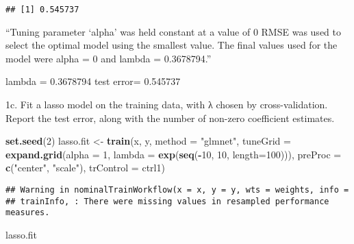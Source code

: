 \documentclass[]{article}
\newenvironment{Shaded}{\begin{snugshade}}{\end{snugshade}}
\newcommand{\CommentTok}[1]{\textcolor[rgb]{0.56,0.35,0.01}{\textit{#1}}}
\newcommand{\DataTypeTok}[1]{\textcolor[rgb]{0.13,0.29,0.53}{#1}}
\newcommand{\DecValTok}[1]{\textcolor[rgb]{0.00,0.00,0.81}{#1}}
\newcommand{\KeywordTok}[1]{\textcolor[rgb]{0.13,0.29,0.53}{\textbf{#1}}}
\newcommand{\NormalTok}[1]{#1}
\newcommand{\OperatorTok}[1]{\textcolor[rgb]{0.81,0.36,0.00}{\textbf{#1}}}
\newcommand{\StringTok}[1]{\textcolor[rgb]{0.31,0.60,0.02}{#1}}
\begin{document}
\begin{Shaded}
\end{Shaded}

\begin{verbatim}
## [1] 0.545737
\end{verbatim}

``Tuning parameter `alpha' was held constant at a value of 0 RMSE was
used to select the optimal model using the smallest value. The final
values used for the model were alpha = 0 and lambda = 0.3678794.''

lambda = 0.3678794 test error= 0.545737

1c. Fit a lasso model on the training data, with λ chosen by
cross-validation. Report the test error, along with the number of
non-zero coefficient estimates.

\begin{Shaded}
\begin{Highlighting}[]
\KeywordTok{set.seed}\NormalTok{(}\DecValTok{2}\NormalTok{)}
\NormalTok{lasso.fit <-}\StringTok{ }\KeywordTok{train}\NormalTok{(x, y,}
                   \DataTypeTok{method =} \StringTok{"glmnet"}\NormalTok{,}
                   \DataTypeTok{tuneGrid =} \KeywordTok{expand.grid}\NormalTok{(}\DataTypeTok{alpha =} \DecValTok{1}\NormalTok{, }
                                          \DataTypeTok{lambda =} \KeywordTok{exp}\NormalTok{(}\KeywordTok{seq}\NormalTok{(}\OperatorTok{-}\DecValTok{10}\NormalTok{, }\DecValTok{10}\NormalTok{, }\DataTypeTok{length=}\DecValTok{100}\NormalTok{))),}
                   \DataTypeTok{preProc =} \KeywordTok{c}\NormalTok{(}\StringTok{"center"}\NormalTok{, }\StringTok{"scale"}\NormalTok{),}
                   \DataTypeTok{trControl =}\NormalTok{ ctrl1)}
\end{Highlighting}
\end{Shaded}

\begin{verbatim}
## Warning in nominalTrainWorkflow(x = x, y = y, wts = weights, info =
## trainInfo, : There were missing values in resampled performance measures.
\end{verbatim}

\begin{Shaded}
\begin{Highlighting}[]
\NormalTok{lasso.fit}
\end{Highlighting}
\end{Shaded}
\end{document}

